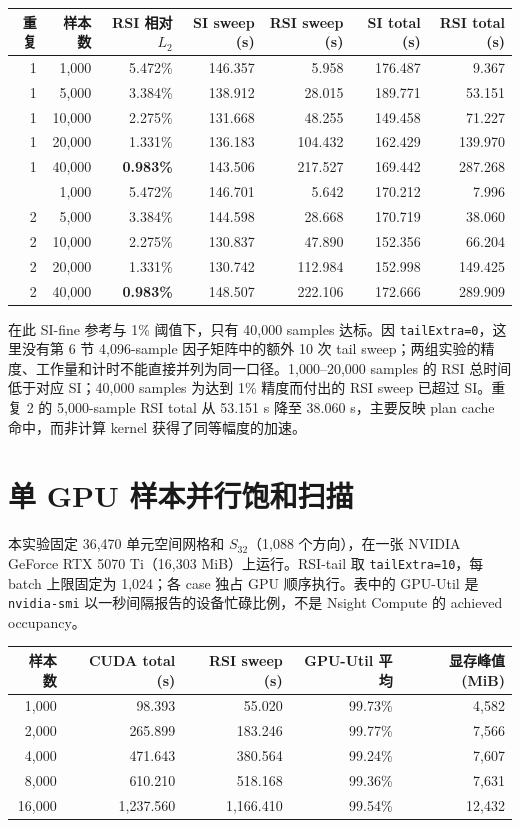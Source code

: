 \documentclass[11pt,a4paper]{article}
\newcommand{\sectiontitle}[1]{\section{\sffamily\color{blue}#1}}
\begin{document}
\begin{tabularx}{\linewidth}{@{}rrrrrrr@{}}
\toprule
重复 & 样本数 & RSI 相对 $L_2$ & SI sweep (s) & RSI sweep (s) & SI total (s) & RSI total (s)\\
\midrule
1 & 1,000  & 5.472\% & 146.357 & 5.958   & 176.487 & 9.367\\
1 & 5,000  & 3.384\% & 138.912 & 28.015  & 189.771 & 53.151\\
1 & 10,000 & 2.275\% & 131.668 & 48.255  & 149.458 & 71.227\\
1 & 20,000 & 1.331\% & 136.183 & 104.432 & 162.429 & 139.970\\
1 & 40,000 & \textbf{0.983\%} & 143.506 & 217.527 & 169.442 & 287.268\\
\addlinespace
2 & 1,000  & 5.472\% & 146.701 & 5.642   & 170.212 & 7.996\\
2 & 5,000  & 3.384\% & 144.598 & 28.668  & 170.719 & 38.060\\
2 & 10,000 & 2.275\% & 130.837 & 47.890  & 152.356 & 66.204\\
2 & 20,000 & 1.331\% & 130.742 & 112.984 & 152.998 & 149.425\\
2 & 40,000 & \textbf{0.983\%} & 148.507 & 222.106 & 172.666 & 289.909\\
\bottomrule
\end{tabularx}

在此 SI-fine 参考与 1\% 阈值下，只有 40,000 samples 达标。因 \texttt{tailExtra=0}，这里没有第 6 节 4,096-sample 因子矩阵中的额外 10 次 tail sweep；两组实验的精度、工作量和计时不能直接并列为同一口径。1,000--20,000 samples 的 RSI 总时间低于对应 SI；40,000 samples 为达到 1\% 精度而付出的 RSI sweep 已超过 SI。重复 2 的 5,000-sample RSI total 从 53.151 s 降至 38.060 s，主要反映 plan cache 命中，而非计算 kernel 获得了同等幅度的加速。

\clearpage
\sectiontitle{单 GPU 样本并行饱和扫描}
本实验固定 36,470 单元空间网格和 $S_{32}$（1,088 个方向），在一张 NVIDIA GeForce RTX 5070 Ti（16,303 MiB）上运行。RSI-tail 取 \texttt{tailExtra=10}，每 batch 上限固定为 1,024；各 case 独占 GPU 顺序执行。表中的 GPU-Util 是 \texttt{nvidia-smi} 以一秒间隔报告的设备忙碌比例，不是 Nsight Compute 的 achieved occupancy。

\begin{tabularx}{\linewidth}{@{}rrrrr@{}}
\toprule
样本数 & CUDA total (s) & RSI sweep (s) & GPU-Util 平均 & 显存峰值 (MiB)\\
\midrule
1,000  & 98.393   & 55.020   & 99.73\% & 4,582\\
2,000  & 265.899  & 183.246  & 99.77\% & 7,566\\
4,000  & 471.643  & 380.564  & 99.24\% & 7,607\\
8,000  & 610.210  & 518.168  & 99.36\% & 7,631\\
16,000 & 1,237.560 & 1,166.410 & 99.54\% & 12,432\\
\bottomrule
\end{tabularx}
\end{document}
